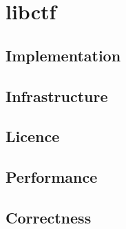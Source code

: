 \chapter{libctf}

\section{Implementation}
\section{Infrastructure}
\section{Licence}
\section{Performance}
\section{Correctness}

